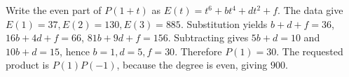 Write the even part of $P(1+t)$ as $E(t)=t^6+bt^4+dt^2+f$. The data give $E(1)=37,E(2)=130,E(3)=885$. Substitution yields $b+d+f=36$, $16b+4d+f=66$, $81b+9d+f=156$. Subtracting gives $5b+d=10$ and $10b+d=15$, hence $b=1,d=5,f=30$. Therefore $P(1)=30$. The requested product is $P(1)P(-1)$, because the degree is even, giving $\boxed{900}$.
